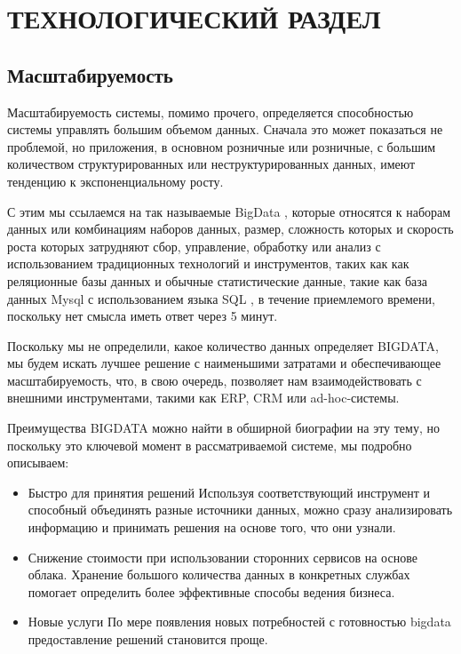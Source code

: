 \chapter{ТЕХНОЛОГИЧЕСКИЙ РАЗДЕЛ}

\section{Масштабируемость}


Масштабируемость системы, помимо прочего, определяется способностью системы управлять большим объемом данных. Сначала это может показаться не проблемой, но приложения, в основном розничные или розничные, с большим количеством структурированных или неструктурированных данных, имеют тенденцию к экспоненциальному росту.


С этим мы ссылаемся на так называемые BigData \cite{bigdata}, которые относятся к наборам данных или комбинациям наборов данных, размер, сложность которых и скорость роста которых затрудняют сбор, управление, обработку или анализ с использованием традиционных технологий и инструментов, таких как как реляционные базы данных и обычные статистические данные, такие как база данных Mysql \cite{mysql} с использованием языка SQL \cite{sql}, в течение приемлемого времени, поскольку нет смысла иметь ответ через 5 минут.


Поскольку мы не определили, какое количество данных определяет BIGDATA, мы будем искать лучшее решение с наименьшими затратами и обеспечивающее масштабируемость, что, в свою очередь, позволяет нам взаимодействовать с внешними инструментами, такими как ERP, CRM или ad-hoc-системы.

Преимущества BIGDATA можно найти в обширной биографии на эту тему, но поскольку это ключевой момент в рассматриваемой системе, мы подробно описываем:

\begin{itemize}
	\item Быстро для принятия решений Используя соответствующий инструмент и способный объединять разные источники данных, можно сразу анализировать информацию и принимать решения на основе того, что они узнали.


\item Снижение стоимости при использовании сторонних сервисов на основе облака. Хранение большого количества данных в конкретных службах помогает определить более эффективные способы ведения бизнеса.

\item Новые услуги По мере появления новых потребностей с готовностью bigdata предоставление решений становится проще.
\end{itemize}

